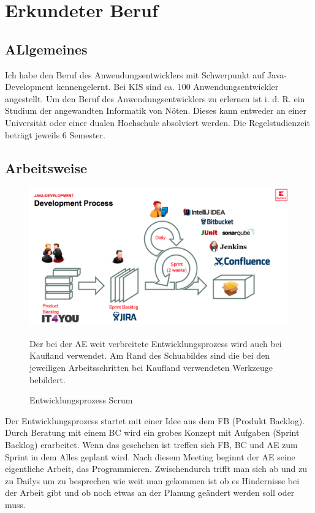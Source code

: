 \chapter{Erkundeter Beruf}

\section{ALlgemeines}

    Ich habe den Beruf des Anwendungsentwicklers mit Schwerpunkt auf Java-Development kennengelernt. Bei KIS sind ca. 100 Anwendungsentwickler angestellt. Um den Beruf des Anwendungsentwicklers zu erlernen ist i. d. R. ein Studium der angewandten Informatik von Nöten. Dieses kann entweder an einer Universität oder einer dualen Hochschule absolviert werden. Die Regelstudienzeit beträgt jeweils 6 Semester. 

\section{Arbeitsweise}

    \begin{figure}[H]
        \centering
        \includegraphics[width=\textwidth]{include/images/DevelopmentProcess.png}
        \caption{Entwicklungsprozess Scrum}
        \small Der bei der AE weit verbreitete Entwicklungsprozess wird auch bei Kaufland verwendet. Am Rand des Schuabildes sind die bei den jeweiligen Arbeitsschritten bei Kaufland verwendeten Werkzeuge bebildert.
        \label{fig-Development-Process}
    \end{figure}

    Der Entwicklungsprozess startet mit einer Idee aus dem FB (Produkt Backlog). Durch Beratung mit einem BC wird ein grobes Konzept mit Aufgaben (Sprint Backlog) erarbeitet.  Wenn das geschehen ist treffen sich FB, BC und AE zum Sprint in dem Alles geplant wird. Nach diesem Meeting beginnt der AE seine eigentliche Arbeit, das Programmieren. Zwischendurch trifft man sich ab und zu zu Dailys um zu besprechen wie weit man gekommen ist ob es Hindernisse bei der Arbeit gibt und ob noch etwas an der Planung geändert werden soll oder muss. 

